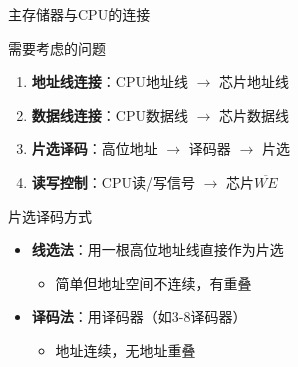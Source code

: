 \documentclass[10pt, aspectratio=169]{beamer}
\begin{document}
\begin{frame}{主存储器与CPU的连接}
    \begin{block}{需要考虑的问题}
        \begin{enumerate}
            \item \textbf{地址线连接}：CPU地址线 $\to$ 芯片地址线
            \item \textbf{数据线连接}：CPU数据线 $\to$ 芯片数据线
            \item \textbf{片选译码}：高位地址 $\to$ 译码器 $\to$ 片选
            \item \textbf{读写控制}：CPU读/写信号 $\to$ 芯片$\overline{WE}$
        \end{enumerate}
    \end{block}
    \vspace{0.3em}
    \begin{block}{片选译码方式}
        \begin{itemize}
            \item \textbf{线选法}：用一根高位地址线直接作为片选
            \begin{itemize}
                \item 简单但地址空间不连续，有重叠
            \end{itemize}
            \item \textbf{译码法}：用译码器（如3-8译码器）
            \begin{itemize}
                \item 地址连续，无地址重叠
            \end{itemize}
        \end{itemize}
    \end{block}
\end{frame}
\end{document}
